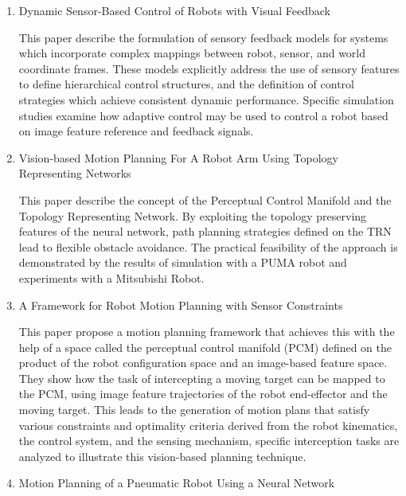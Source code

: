 \documentclass[paper=a4, fontsize=11pt]{scrartcl} %
\numberwithin{equation}{section} %
\numberwithin{figure}{section} %
\numberwithin{table}{section} %
\begin{document}
\begin{enumerate}
\item Dynamic Sensor-Based Control of Robots with Visual Feedback

This paper describe the formulation of sensory feedback models for systems which incorporate complex mappings between robot, sensor, and world coordinate frames. These models explicitly address the use of sensory features to define hierarchical control structures, and the definition of control strategies which achieve consistent dynamic performance. Specific simulation studies examine how adaptive control may be used to control a robot based on image feature reference and feedback signals. 

\item Vision-based Motion Planning For A Robot Arm Using Topology Representing Networks

This paper describe the concept of the Perceptual Control Manifold and the Topology Representing Network. By exploiting the topology preserving features of the neural network, path planning strategies defined on the TRN lead to flexible obstacle avoidance. The practical feasibility of the approach is demonstrated by the results of simulation with a PUMA robot and experiments with a Mitsubishi Robot. 

\item A Framework for Robot Motion Planning with Sensor Constraints

This paper propose a motion planning framework that achieves this with the help of a space called the perceptual control manifold (PCM) defined on the product of the robot configuration space and an image-based feature space. They show how the task of intercepting a moving target can be mapped to the PCM, using image feature trajectories of the robot end-effector and the moving target. This leads to the generation of motion plans that satisfy various constraints and optimality criteria derived from the robot kinematics, the control system, and the sensing mechanism, specific interception tasks are analyzed to illustrate this vision-based planning technique. 

\item Motion Planning of a Pneumatic Robot Using a Neural Network


\end{enumerate}
\end{document}
